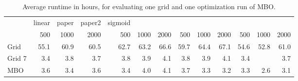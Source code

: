 \begin{table}

\caption{\label{tab:table_time}Average runtime in hours, for evaluating one grid and one optimization run of MBO.}
\centering
\begin{tabular}[t]{lrrrrrrrrrrrr}
\toprule
\multicolumn{1}{c}{ } & \multicolumn{4.5}{c}{linear} & \multicolumn{4.5}{c}{paper} & \multicolumn{4.5}{c}{paper2} & \multicolumn{4.5}{c}{sigmoid} \\
\cmidrule(l{3pt}r{3pt}){2-5.5} \cmidrule(l{3pt}r{3pt}){6.5-10} \cmidrule(l{3pt}r{3pt}){11-14.5} \cmidrule(l{3pt}r{3pt}){15.5-19}
 & 500 & 1000 & 2000 & 500 & 1000 & 2000 & 500 & 1000 & 2000 & 500 & 1000 & 2000\\
\midrule
Grid & 55.1 & 60.9 & 60.5 & 62.7 & 63.2 & 66.6 & 59.7 & 64.4 & 67.1 & 54.6 & 52.8 & 61.0\\
Grid 7 & 3.4 & 3.8 & 3.7 & 3.8 & 3.9 & 4.1 & 3.8 & 3.9 & 4.1 & 3.4 &  & 3.7\\
MBO & 3.6 & 3.4 & 3.6 & 3.4 & 4.0 & 4.1 & 3.7 & 3.3 & 3.2 & 3.3 & 2.6 & 3.1\\
\bottomrule
\end{tabular}
\end{table}
